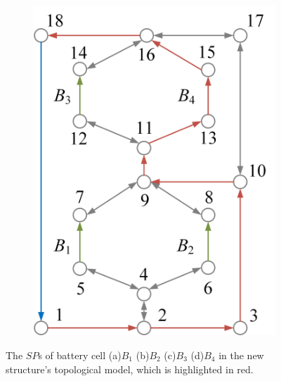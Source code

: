 \documentclass{article}
\begin{document}
\begin{figure}[htbp]
\begin{subfigure}[b]{0.45\textwidth}
        \includegraphics[width=\textwidth]{../attachments/ef-sp4.png}
        \caption{}
        \label{fig:sp4}
    \end{subfigure}
    \caption{
        The $SP$s of battery cell (a)$B_1$ (b)$B_2$ (c)$B_3$ (d)$B_4$ in the new structure's topological model, which is highlighted in red.
        }
\end{figure}
\end{document}
